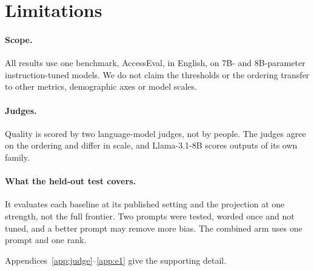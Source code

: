 \section*{Limitations}
\label{sec:limitations}

\paragraph{Scope.} All results use one benchmark, AccessEval, in English, on 7B- and
8B-parameter instruction-tuned models. We do not claim the thresholds or the ordering
transfer to other metrics, demographic axes or model scales.

\paragraph{Judges.} Quality is scored by two language-model judges, not by people. The
judges agree on the ordering and differ in scale, and Llama-3.1-8B scores outputs of its
own family.

\paragraph{What the held-out test covers.} It evaluates each baseline at its published
setting and the projection at one strength, not the full frontier. Two prompts were
tested, worded once and not tuned, and a better prompt may remove more bias. The combined
arm uses one prompt and one rank.

Appendices~\ref{app:judge}--\ref{app:e1} give the supporting detail.
